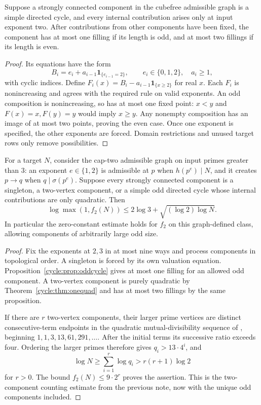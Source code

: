 \begin{proposition}\label{cycle:prop:oddcycle}
Suppose a strongly connected component in the cubefree admissible graph is a simple directed cycle, and every internal contribution arises only at input exponent two. After contributions from other components have been fixed, the component has at most one filling if its length is odd, and at most two fillings if its length is even.
\end{proposition}
\begin{proof}
Its equations have the form
\[
 B_i=e_i+a_{i-1}\mathbf1_{\{e_{i-1}=2\}},\qquad e_i\in\{0,1,2\},\quad a_i\ge1,
\]
with cyclic indices. Define $F_i(x)=B_i-a_{i-1}\mathbf1_{\{x\ge2\}}$ for real $x$. Each $F_i$ is nonincreasing and agrees with the required rule on valid exponents. An odd composition is nonincreasing, so has at most one fixed point: $x<y$ and $F(x)=x,F(y)=y$ would imply $x\ge y$. Any nonempty composition has an image of at most two points, proving the even case. Once one exponent is specified, the other exponents are forced. Domain restrictions and unused target rows only remove possibilities.
\end{proof}


\begin{corollary}\label{cycle:cor:graphclass}
For a target $N$, consider the cap-two admissible graph on input primes greater than $3$: an exponent $e\in\{1,2\}$ is admissible at $p$ when $h(p^e)\mid N$, and it creates $p\to q$ when $q\mid\sigma(p^e)$. Suppose every strongly connected component is a singleton, a two-vertex component, or a simple odd directed cycle whose internal contributions are only quadratic. Then
\[
 \log\max(1,f_2(N))\le 2\log3+\sqrt{(\log2)\log N}.
\]
In particular the zero-constant estimate holds for $f_2$ on this graph-defined class, allowing components of arbitrarily large odd size.
\end{corollary}
\begin{proof}
Fix the exponents at $2,3$ in at most nine ways and process components in topological order. A singleton is forced by its own valuation equation. Proposition~\ref{cycle:prop:oddcycle} gives at most one filling for an allowed odd component. A two-vertex component is purely quadratic by Theorem~\ref{cycle:thm:onequad} and has at most two fillings by the same proposition.

If there are $r$ two-vertex components, their larger prime vertices are distinct consecutive-term endpoints in the quadratic mutual-divisibility sequence of \cite[Lemma 5]{bibby}, beginning $1,1,3,13,61,291,\ldots$. After the initial terms its successive ratio exceeds four. Ordering the larger primes therefore gives $q_i>13\cdot4^i$, and
\[
 \log N\ge\sum_{i=1}^r\log q_i>r(r+1)\log2
\]
for $r>0$. The bound $f_2(N)\le9\cdot2^r$ proves the assertion. This is the two-component counting estimate from the previous note, now with the unique odd components included.
\end{proof}

